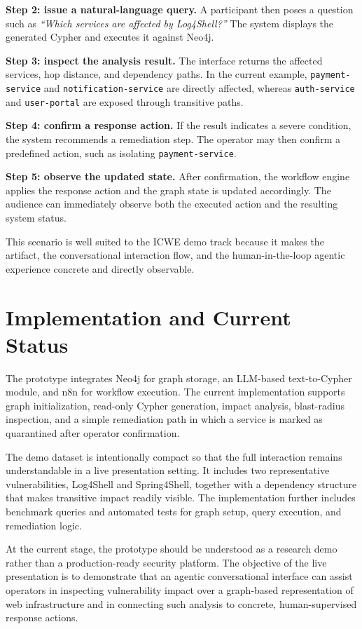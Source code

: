 \documentclass[runningheads]{llncs}
\begin{document}
\textbf{Step 2: issue a natural-language query.}
A participant then poses a question such as \emph{``Which services are affected by Log4Shell?''} The system displays the generated Cypher and executes it against Neo4j.

\textbf{Step 3: inspect the analysis result.}
The interface returns the affected services, hop distance, and dependency paths. In the current example, \texttt{payment-service} and \texttt{notification-service} are directly affected, whereas \texttt{auth-service} and \texttt{user-portal} are exposed through transitive paths.

\textbf{Step 4: confirm a response action.}
If the result indicates a severe condition, the system recommends a remediation step. The operator may then confirm a predefined action, such as isolating \texttt{payment-service}.

\textbf{Step 5: observe the updated state.}
After confirmation, the workflow engine applies the response action and the graph state is updated accordingly. The audience can immediately observe both the executed action and the resulting system status.

This scenario is well suited to the ICWE demo track because it makes the artifact, the conversational interaction flow, and the human-in-the-loop agentic experience concrete and directly observable.

\section{Implementation and Current Status}
The prototype integrates Neo4j for graph storage, an LLM-based text-to-Cypher module, and n8n for workflow execution. The current implementation supports graph initialization, read-only Cypher generation, impact analysis, blast-radius inspection, and a simple remediation path in which a service is marked as quarantined after operator confirmation.

The demo dataset is intentionally compact so that the full interaction remains understandable in a live presentation setting. It includes two representative vulnerabilities, Log4Shell and Spring4Shell, together with a dependency structure that makes transitive impact readily visible. The implementation further includes benchmark queries and automated tests for graph setup, query execution, and remediation logic.

At the current stage, the prototype should be understood as a research demo rather than a production-ready security platform. The objective of the live presentation is to demonstrate that an agentic conversational interface can assist operators in inspecting vulnerability impact over a graph-based representation of web infrastructure and in connecting such analysis to concrete, human-supervised response actions.
\end{document}
